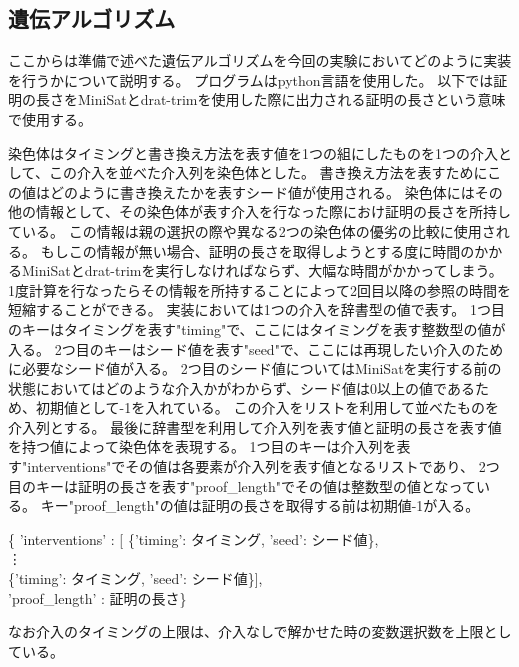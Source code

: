 \subsection{遺伝アルゴリズム}



ここからは準備で述べた遺伝アルゴリズムを今回の実験においてどのように実装を行うかについて説明する。
プログラムはpython言語を使用した。
以下では証明の長さをMiniSatとdrat-trimを使用した際に出力される証明の長さという意味で使用する。

染色体はタイミングと書き換え方法を表す値を1つの組にしたものを1つの介入として、この介入を並べた介入列を染色体とした。
書き換え方法を表すためにこの値はどのように書き換えたかを表すシード値が使用される。
染色体にはその他の情報として、その染色体が表す介入を行なった際におけ証明の長さを所持している。
この情報は親の選択の際や異なる2つの染色体の優劣の比較に使用される。
もしこの情報が無い場合、証明の長さを取得しようとする度に時間のかかるMiniSatとdrat-trimを実行しなければならず、大幅な時間がかかってしまう。
1度計算を行なったらその情報を所持することによって2回目以降の参照の時間を短縮することができる。
実装においては1つの介入を辞書型の値で表す。
1つ目のキーはタイミングを表す"timing"で、ここにはタイミングを表す整数型の値が入る。
2つ目のキーはシード値を表す"seed"で、ここには再現したい介入のために必要なシード値が入る。
2つ目のシード値についてはMiniSatを実行する前の状態においてはどのような介入かがわからず、シード値は0以上の値であるため、初期値として-1を入れている。
この介入をリストを利用して並べたものを介入列とする。
最後に辞書型を利用して介入列を表す値と証明の長さを表す値を持つ値によって染色体を表現する。
1つ目のキーは介入列を表す"interventions"でその値は各要素が介入列を表す値となるリストであり、
2つ目のキーは証明の長さを表す"proof\_length"でその値は整数型の値となっている。
キー"proof\_length"の値は証明の長さを取得する前は初期値-1が入る。
\begin{flushleft}
             \{ 'interventions'  : [ \{'timing': タイミング,  'seed': シード値\},\\
    \phantom{\{ 'interventions'  : [ \{'timing': タイミング,}\vdots\\
    \phantom{\{ 'interventions'  : [}\{'timing': タイミング,  'seed': シード値\}],\\
    \phantom{\{}'proof\_length'  : 証明の長さ\}
\end{flushleft}
なお介入のタイミングの上限は、介入なしで解かせた時の変数選択数を上限としている。


